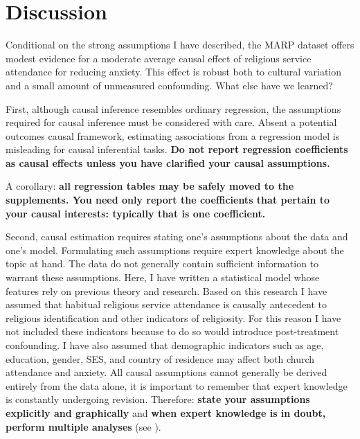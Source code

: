 \documentclass[]{interact}
\theoremstyle{plain}%
\theoremstyle{definition}
\theoremstyle{remark}
\begin{document}
\section{Discussion}

Conditional on the strong assumptions I have described, the MARP dataset offers modest evidence for a moderate average causal effect of religious service attendance for reducing anxiety. This effect is robust both to cultural variation and a small amount of unmeasured confounding. What else have we learned? 

First, although causal inference resembles ordinary regression, the assumptions required for causal inference must be considered with care. Absent a potential outcomes causal framework, estimating associations from a regression model is misleading for causal inferential tasks. {\bf Do not report regression coefficients as causal effects unless you have clarified your causal assumptions.}

A corollary: \textbf{all regression tables may be safely moved to the supplements. You need only report the coefficients that pertain to your causal interests: typically that is one coefficient.}

Second, causal estimation requires stating one's assumptions about the data and one's model. Formulating such assumptions require expert knowledge about the topic at hand. The data do not generally contain sufficient information to warrant these assumptions. Here, I have written a statistical model whose features rely on previous theory and research. Based on this research I have assumed that habitual religious service attendance is causally antecedent to religious identification and other indicators of religiosity. For this reason I have not included these indicators because to do so would introduce post-treatment confounding.  I have also assumed that demographic indicators such as age, education, gender, SES, and country of residence may affect both church attendance and anxiety. All causal assumptions cannot generally be derived entirely from the data alone, it is important to remember that expert knowledge is constantly undergoing revision. Therefore: {\bf state your assumptions explicitly and graphically} and {\bf when expert knowledge is in doubt, perform multiple analyses} (see \citet{bulbulia_causal_2021}).
\end{document}
